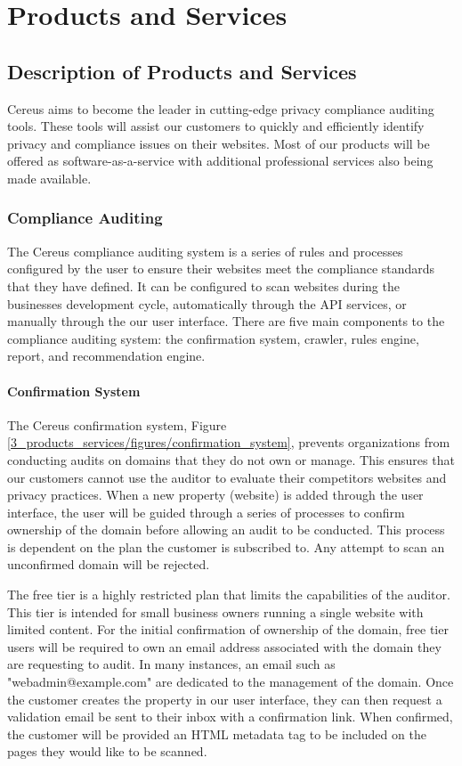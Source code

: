 {\let\cleardoublepage\relax \chapter{Products and Services}}

\section{Description of Products and Services}

Cereus aims to become the leader in cutting-edge privacy compliance auditing tools. These tools will assist our customers to quickly and efficiently identify privacy and compliance issues on their websites. Most of our products will be offered as software-as-a-service with additional professional services also being made available. 

\subsection{Compliance Auditing}

The Cereus compliance auditing system is a series of rules and processes configured by the user to ensure their websites meet the compliance standards that they have defined. It can be configured to scan websites during the businesses development cycle, automatically through the API services, or manually through the our user interface. There are five main components to the compliance auditing system: the confirmation system, crawler, rules engine, report, and recommendation engine.

\subsubsection{Confirmation System}

The Cereus confirmation system, Figure \ref{3_products_services/figures/confirmation_system}, prevents organizations from conducting audits on domains that they do not own or manage. This ensures that our customers cannot use the auditor to evaluate their competitors websites and privacy practices. When a new property (website) is added through the user interface, the user will be guided through a series of processes to confirm ownership of the domain before allowing an audit to be conducted. This process is dependent on the plan the customer is subscribed to. Any attempt to scan an unconfirmed domain will be rejected.

The free tier is a highly restricted plan that limits the capabilities of the auditor. This tier is intended for small business owners running a single website with limited content. For the initial confirmation of ownership of the domain, free tier users will be required to own an email address associated with the domain they are requesting to audit. In many instances, an email such as "webadmin@example.com" are dedicated to the management of the domain. Once the customer creates the property in our user interface, they can then request a validation email be sent to their inbox with a confirmation link. When confirmed, the customer will be provided an HTML metadata tag to be included on the pages they would like to be scanned.

